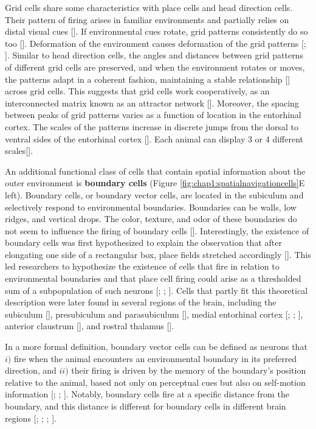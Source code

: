 Grid cells share some characteristics with place cells and head direction cells.
Their pattern of firing arises in familiar environments and partially relies on distal visual cues [\cite{hafting2005}]. 
If environmental cues rotate, grid patterns consistently do so too [\cite{hafting2005}]. 
Deformation of the environment causes deformation of the grid patterns [\cite{barry2007}; \cite{stensola2012}].
Similar to head direction cells, the angles and distances between grid patterns of different grid cells are preserved, and when the environment rotates or moves, the patterns adapt in a coherent fashion, maintaining a stable relationship [\cite{fyhn2007}] across grid cells.
This suggests that grid cells work cooperatively, as an interconnected matrix known as an attractor network [\cite{mcNaughton2006}].
Moreover, the spacing between peaks of grid patterns varies as a function of location in the entorhinal cortex. 
The scales of the patterns increase in discrete jumps from the dorsal to ventral sides of the entorhinal cortex [\cite{brun2008}].
Each animal can display 3 or 4 different scales[\cite{brun2008}]. 

An additional functional class of cells that contain spatial information about the outer environment is \textbf{boundary cells} (Figure \ref{fig:chap1:spatialnavigationcells}E left).
Boundary cells, or boundary vector cells, are located in the subiculum and selectively respond to environmental boundaries. 
Boundaries can be walls, low ridges, and vertical drops. The color, texture, and odor of these boundaries do not seem to influence the firing of boundary cells [\cite{lever2009}].
Interestingly, the existence of boundary cells was first hypothesized to explain the observation that after elongating one side of a rectangular box, place fields stretched accordingly [\cite{oKeefe1996}].
This led researchers to hypothesize the existence of cells that fire in relation to environmental boundaries and that place cell firing could arise as a thresholded sum of a subpopulation of such neurons [\cite{barry2006}; \cite{burgess1997}; \cite{hartley2000}]. 
Cells that partly fit this theoretical description were later found in several regions of the brain, including the subiculum [\cite{barry2006}], presubiculum and parasubiculum [\cite{boccara2010}], medial entorhinal cortex [\cite{bjerknes2014}; \cite{savelli2008}; \cite{solstad2008}], anterior claustrum [\cite{jankowskiomara2015}], and rostral thalamus [\cite{jankowski2015}].

In a more formal definition, boundary vector cells can be defined as neurons that $i)$ fire when the animal encounters an environmental boundary in its preferred direction, and $ii)$ their firing is driven by the memory of the boundary's position relative to the animal, based not only on perceptual cues but also on self-motion information [\cite{lever2009}; \cite{raudies2012}; \cite{raudieshasselmo2012}]. 
Notably, boundary cells fire at a specific distance from the boundary, and this distance is different for boundary cells in different brain regions [\cite{bjerknes2014}; \cite{solstad2008}; \cite{jankowski2015}; \cite{lever2009}].

